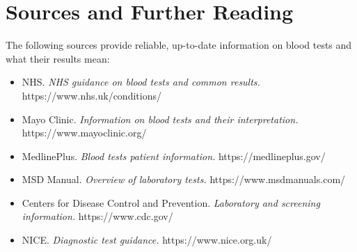 \section*{Sources and Further Reading}
The following sources provide reliable, up-to-date information on blood tests and what their results mean:

\begin{itemize}
    \item NHS. \textit{NHS guidance on blood tests and common results.} https://www.nhs.uk/conditions/
    \item Mayo Clinic. \textit{Information on blood tests and their interpretation.} https://www.mayoclinic.org/
    \item MedlinePlus. \textit{Blood tests patient information.} https://medlineplus.gov/
    \item MSD Manual. \textit{Overview of laboratory tests.} https://www.msdmanuals.com/
    \item Centers for Disease Control and Prevention. \textit{Laboratory and screening information.} https://www.cdc.gov/
    \item NICE. \textit{Diagnostic test guidance.} https://www.nice.org.uk/
\end{itemize}
